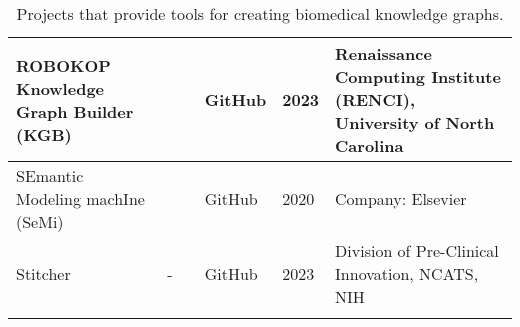 \documentclass{article}
\begin{document}
\begin{landscape}
\begin{xltabular}{\textwidth}{p{5cm}|p{2.2cm}|p{2.2cm}|p{2.2cm}|p{1cm}|p{6cm}}
ROBOKOP Knowledge Graph Builder (KGB)
&
\cite{robokop_website1}
&
\cite{robokop_publication2}
&
GitHub
\cite{robokop_github}
&
2023
&
Renaissance Computing Institute (RENCI), University of North Carolina
\cite{robokop_group}
\\


\hline


SEmantic Modeling machIne (SeMi)
&
\cite{semi_website}
&
\cite{semi_publication}
&
GitHub
\cite{semi_github}
&
2020
&
Company: Elsevier
\\


\hline


Stitcher
&
-
&
\cite{stitcher_publication}
&
GitHub
\cite{stitcher_github}
&
2023
&
Division of Pre-Clinical Innovation, NCATS, NIH
\cite{stitcher_group}
\\


\caption{Projects that provide tools for creating biomedical knowledge graphs.}
\label{table:tools}
\end{xltabular}

\end{landscape}





\newpage
\printbibliography
\end{document}
